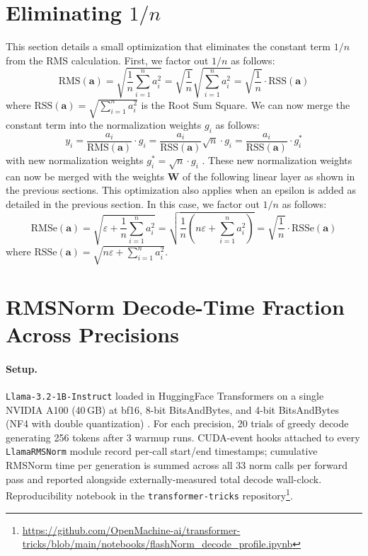 \documentclass{article}
\newcommand{\mat}[1]{\mathbf{#1}}     %
\def\rms{\text{RMS}(\mathbf{a})}      %
\def\f1n{\frac{1}{n}}                 %
\def\sas{\sum_{i=1}^n a_i^2}           %
\def\a{\mathbf{a}}                    %
\begin{document}
\section{Eliminating $1/n$}
This section details a small optimization that eliminates the constant term $1/n$ from the RMS calculation. First, we factor out $1/n$ as follows:
\begin{equation*}
  \rms = \sqrt{\f1n \sas} = \sqrt{\f1n} \sqrt{\sas} = \sqrt{\f1n} \cdot \text{RSS}(\a)
\end{equation*}
where $\text{RSS}(\a) = \sqrt{\sas}$ is the Root Sum Square. We can now merge the constant term into the normalization weights $g_i$ as follows:
\begin{equation*}
  y_i = \frac{a_i}{\rms} \cdot g_i =
  \frac{a_i}{\text{RSS}(\a)} \sqrt{n} \cdot g_i =
  \frac{a_i}{\text{RSS}(\a)}          \cdot g_i^\ast
\end{equation*}
with new normalization weights $g_i^\ast = \sqrt{n} \cdot g_i$ . These new normalization weights can now be merged with the weights $\mat{W}$ of the following linear layer as shown in the previous sections. This optimization also applies when an epsilon is added as detailed in the previous section. In this case, we factor out $1/n$ as follows:
\begin{equation*}
  \text{RMSe}(\a) = \sqrt{\varepsilon + \f1n \sas}
  = \sqrt{\f1n \left( n \varepsilon + \sas \right)}
  = \sqrt{\f1n} \cdot \text{RSSe}(\a)
\end{equation*}
where $\text{RSSe}(\a) = \sqrt{n \varepsilon + \sas}$.

\section{RMSNorm Decode-Time Fraction Across Precisions}\label{app:rmsnorm-fraction}

\paragraph{Setup.} \texttt{Llama-3.2-1B-Instruct} loaded in HuggingFace Transformers on a single NVIDIA A100 (40\,GB) at bf16, 8-bit BitsAndBytes, and 4-bit BitsAndBytes (NF4 with double quantization) \citep{bitsandbytes}. For each precision, 20 trials of greedy decode generating 256 tokens after 3 warmup runs. CUDA-event hooks attached to every \texttt{LlamaRMSNorm} module record per-call start/end timestamps; cumulative RMSNorm time per generation is summed across all 33 norm calls per forward pass and reported alongside externally-measured total decode wall-clock.
Reproducibility notebook in the \texttt{transformer-tricks} repository\footnote{\url{https://github.com/OpenMachine-ai/transformer-tricks/blob/main/notebooks/flashNorm\_decode\_profile.ipynb}}.
\end{document}
